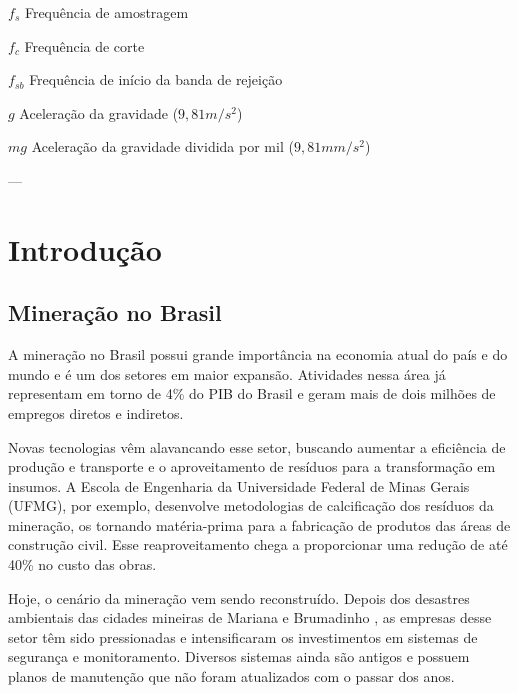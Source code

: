 \documentclass[
	12pt,				%
	openright,			%
	twoside,			%
	a4paper,			%
	english,			%
	french,				%
	spanish,			%
	brazil,				%
	]{abntex2}
\begin{document}
\begin{simbolos}
  \item[$ f_{s} $] Frequência de amostragem
  \item[$ f_{c} $] Frequência de corte
  \item[$ f_{sb} $] Frequência de início da banda de rejeição
  \item[$ g $] Aceleração da gravidade ($9,81m/s^2$)
  \item[$ mg $] Aceleração da gravidade dividida por mil ($9,81mm/s^2$)
\end{simbolos}
---

\tableofcontents*
\cleardoublepage

\textual


\chapter{Introdução}

	\section{Mineração no Brasil}

		A mineração no Brasil possui grande importância na economia atual do país e do mundo e é um dos setores em maior expansão. Atividades nessa área já representam em torno de 4\% do PIB do Brasil e geram mais de dois milhões de empregos diretos e indiretos.\cite{pib}

		Novas tecnologias vêm alavancando esse setor, buscando aumentar a eficiência de produção e transporte e o aproveitamento de resíduos para a transformação em insumos. A Escola de Engenharia da Universidade Federal de Minas Gerais (UFMG), por exemplo, desenvolve metodologias de calcificação dos resíduos da mineração, os tornando matéria-prima para a fabricação de produtos das áreas de construção civil. Esse reaproveitamento chega a proporcionar uma redução de até 40\% no custo das obras.\cite{mineracaoUFMG}

		Hoje, o cenário da mineração vem sendo reconstruído. Depois dos desastres ambientais das cidades mineiras de Mariana \cite{mariana} e Brumadinho \cite{brumadinho} , as empresas desse setor têm sido pressionadas e intensificaram os investimentos em sistemas de segurança e monitoramento. Diversos sistemas ainda são antigos e possuem planos de manutenção que não foram atualizados com o passar dos anos.
		
\end{document}
